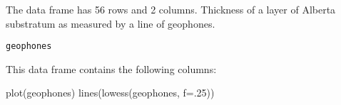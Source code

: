 \begin{Description}\relax
The  data frame has 56 rows and 2 columns.
Thickness of a layer of Alberta substratum as measured by
a line of geophones.
\end{Description}
\begin{Usage}
\begin{verbatim}geophones\end{verbatim}
\end{Usage}
\begin{Format}\relax
This data frame contains the following columns:
\end{Format}
\begin{Examples}
\begin{ExampleCode}
plot(geophones)
lines(lowess(geophones, f=.25))
\end{ExampleCode}
\end{Examples}

